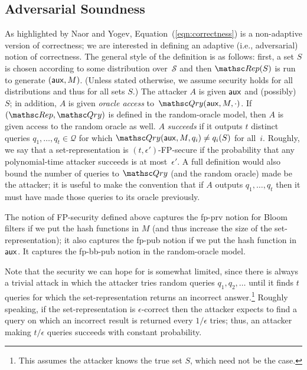 \subsection{Adversarial Soundness}
As highlighted by Naor and Yogev,
Equation~(\ref{eqn:correctness}) is a non-adaptive version of correctness;
we are interested in defining an adaptive (i.e., adversarial) notion
of correctness. 
The general style of the definition is as follows:
first, a set $S$ is chosen according to some distribution over~$\mathcal{S}$ and then
$\Rep(S)$ is run to generate $({\sf aux}, M)$. (Unless stated otherwise, we assume
security holds for all distributions and thus for all sets $S$.)
The attacker $A$ is given ${\sf aux}$ and (possibly)~$S$;
in addition, $A$ is given \emph{oracle access} to~$\Qry(\aux, M, \cdot)$.
If $(\Rep, \Qry)$ is defined in the random-oracle model, then
$A$ is given access to the random oracle as well.
$A$ \emph{succeeds} if it outputs $t$ distinct queries $q_1, \ldots, q_t \in \mathcal{Q}$ for which
$\Qry(\aux, M, q_i) \neq q_i(S)$ for all~$i$.
Roughly, we say that a set-representation is $(t,\epsilon')$-FP-secure if the probability that
any polynomial-time attacker succeeds is at most~$\epsilon'$. A full definition
would also bound the number of queries to $\Qry$ (and the random oracle) made
be the attacker; it is useful to make the convention that if $A$ outputs
$q_1, \ldots, q_t$ then it must have made those queries to its oracle previously.

The notion of FP-security defined above captures the fp-prv notion for Bloom filters
if we put the hash
functions in $M$ (and thus increase the size of the set-representation); it also captures the fp-pub
notion if we put the hash function in~${\sf aux}$.   It captures the fp-bb-pub notion in the
random-oracle model.

Note that the security we can hope for is somewhat limited, since there
is always a trivial attack in which
the attacker tries random queries $q_1, q_2, \ldots$ until it finds $t$ queries for which the
set-representation returns an incorrect answer.\footnote{This assumes the attacker
knows the true set $S$, which need not be the case.} Roughly speaking,
if the set-representation is $\epsilon$-correct then the attacker expects to find a query on which
an incorrect result is returned
every $1/\epsilon$ tries; thus, an
attacker making $t/\epsilon$ queries succeeds with constant probability.

